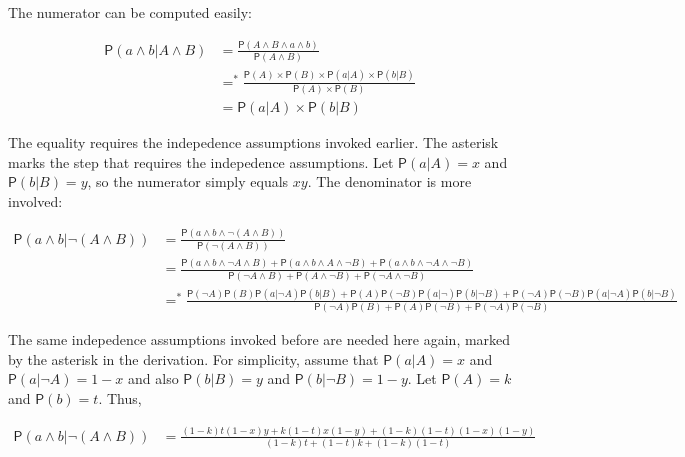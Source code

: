 \documentclass[10pt,dvipsnames,enabledeprecatedfontcommands]{scrartcl}
\newcommand{\et}{\wedge}
\newcommand{\pr}[1]{\mathsf{P}(#1)}
\begin{document}
The numerator can be computed
easily:

\begin{align*}
\pr{a \wedge b| A\wedge B} & =  \frac{\pr{A \et B \et a\et b}}{\pr{A \et B}}\\
& =^* \frac{\pr{A} \times \pr{B} \times \pr{a | A} \times \pr{b | B}}{\pr{A}  \times \pr{B}} \\
& = \pr{a | A} \times \pr{b | B} 
 \end{align*}

\noindent
 The equality requires the indepedence assumptions invoked earlier. The
asterisk marks the step that requires the indepedence
assumptions.
Let \(\pr{a |A}=x\) and \(\pr{b |B}=y\), so the numerator simply equals
\(xy\). The denominator is more involved:

\begin{align*}
\pr{a \et b| \neg (A\et B)} & = \frac{\pr{a \et b \et \neg (A\et B)}}{\pr{\neg (A \et B)}} \\
& = \frac{\pr{a \et b \et \neg A\et B} +  \pr{a \et b \et A\et \neg B} + \pr{a \et b \et \neg A\et \neg B}  }{\pr{\neg A \et B} + \pr{A \et \neg B} + \pr{\neg A \et \neg B} } \\
& =^* \frac{\pr{\neg A}\pr{B} \pr{a | \neg A}\pr{b | B} + \pr{A}\pr{\neg B} \pr{a | \neg }\pr{b | \neg B} + \pr{\neg A}\pr{\neg B} \pr{a | \neg A}\pr{b | \neg B}}{\pr{\neg A}\pr{B} + \pr{A}\pr{\neg B} + \pr{\neg A}\pr{\neg B} }  
 \end{align*}


\noindent  The same indepedence assumptions invoked before are needed
here again,
marked by the asterisk in the derivation. For simplicity,
assume that \(\pr{a |A}=x\) and \(\pr{a |\neg A}=1-x\)
and also \(\pr{b |B}=y\) and \(\pr{b | \neg B}=1-y\). Let \(\pr{A}=k\)
and \(\pr{b}=t\). Thus,

\begin{align*}
\pr{a \et b| \neg (A\et B)} & = \frac{(1-k)t(1-x)y + k(1-t)x(1-y) + (1-k)(1-t)(1-x)(1-y)}{ \left(1-k\right) t +\left(1-t\right) k+\left(1-k\right) \left(1-t\right) }
 \end{align*}
\end{document}
